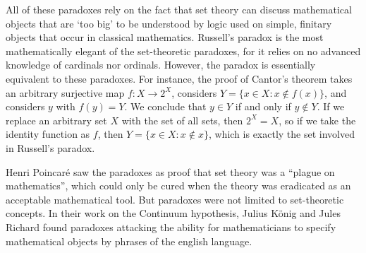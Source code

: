 All of these paradoxes rely on the fact that set theory can discuss mathematical objects that are `too big' to be understood by logic used on simple, finitary objects that occur in classical mathematics. Russell's paradox is the most mathematically elegant of the set-theoretic paradoxes, for it relies on no advanced knowledge of cardinals nor ordinals. However, the paradox is essentially equivalent to these paradoxes. For instance, the proof of Cantor's theorem takes an arbitrary surjective map $f: X \to 2^X$, considers $Y = \{ x \in X: x \not \in f(x) \}$, and considers $y$ with $f(y) = Y$. We conclude that $y \in Y$ if and only if $y \not \in Y$. If we replace an arbitrary set $X$ with the set of all sets, then $2^X = X$, so if we take the identity function as $f$, then $Y = \{ x \in X : x \not \in x \}$, which is exactly the set involved in Russell's paradox.

Henri Poincar\'{e} saw the paradoxes as proof that set theory was a ``plague on mathematics'', which could only be cured when the theory was eradicated as an acceptable mathematical tool. But paradoxes were not limited to set-theoretic concepts. In their work on the Continuum hypothesis, Julius K\"{o}nig and Jules Richard found paradoxes attacking the ability for mathematicians to specify mathematical objects by phrases of the english language.

